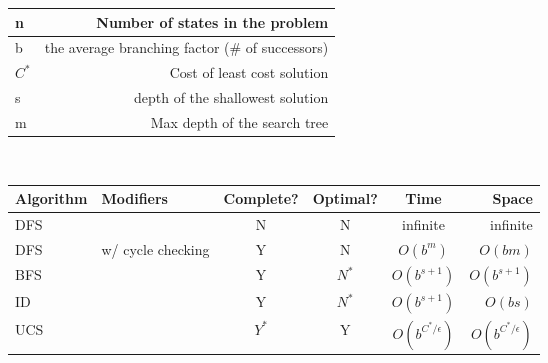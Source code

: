 \documentclass[10pt]{article}
\begin{document}
\begin{multicols*}{2}
\begin{tabular}{| l | r |}\hline
	n & Number of states in the problem \\ \hline
	b & the average branching factor (\# of successors) \\ \hline
	$C^*$ & Cost of least cost solution \\ \hline
	s & depth of the shallowest solution \\ \hline
	m & Max depth of the search tree \\ \hline
	\end{tabular}\\
\begin{tabular}{| l | l || c | c | c | r |}\hline
	Algorithm & Modifiers & Complete? & Optimal? & Time & Space \\ \hline
	DFS && N & N & infinite & infinite \\ \hline
	DFS & w/ cycle checking & Y & N & $O(b^m)$ & $O(bm)$ \\ \hline
	BFS && Y & $N^*$ & $O(b^{s+1})$ & $O(b^{s+1})$ \\ \hline
	ID && Y & $N^*$ & $O(b^{s+1})$ & $O(bs)$ \\ \hline
	UCS && $Y^*$ & Y & $O(b^{C^*/\epsilon})$ & $O(b^{C^*/\epsilon})$ \\ \hline
	\end{tabular}

\end{multicols*}
\end{document}
